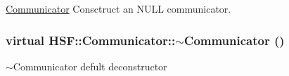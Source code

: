 \hyperlink{classHSF_1_1Communicator}{Communicator} Consctruct an NULL communicator. \hypertarget{classHSF_1_1Communicator_a3cd6eb9e85605b89e7763246aac70bb0}{
\subsubsection[{$\sim$Communicator}]{\setlength{\rightskip}{0pt plus 5cm}virtual HSF::Communicator::$\sim$Communicator ()}}
\label{classHSF_1_1Communicator_a3cd6eb9e85605b89e7763246aac70bb0}


$\sim$Communicator defult deconstructor 

